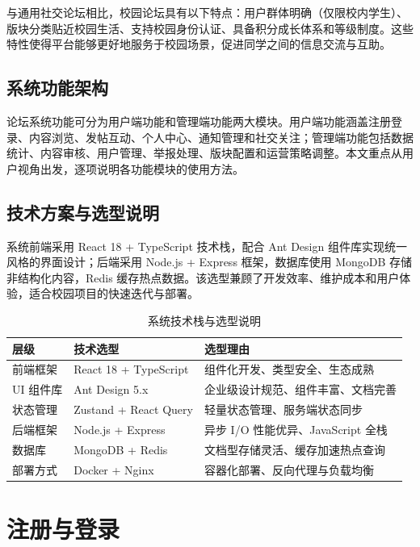 \documentclass[12pt,a4paper]{article}
\begin{document}
与通用社交论坛相比，校园论坛具有以下特点：用户群体明确（仅限校内学生）、版块分类贴近校园生活、支持校园身份认证、具备积分成长体系和等级制度。这些特性使得平台能够更好地服务于校园场景，促进同学之间的信息交流与互助。

\subsection{系统功能架构}
论坛系统功能可分为用户端功能和管理端功能两大模块。用户端功能涵盖注册登录、内容浏览、发帖互动、个人中心、通知管理和社交关注；管理端功能包括数据统计、内容审核、用户管理、举报处理、版块配置和运营策略调整。本文重点从用户视角出发，逐项说明各功能模块的使用方法。

\subsection{技术方案与选型说明}
系统前端采用 React 18 + TypeScript 技术栈，配合 Ant Design 组件库实现统一风格的界面设计；后端采用 Node.js + Express 框架，数据库使用 MongoDB 存储非结构化内容，Redis 缓存热点数据。该选型兼顾了开发效率、维护成本和用户体验，适合校园项目的快速迭代与部署。

\begin{table}[!htbp]
    \caption{系统技术栈与选型说明}
    \label{tab:tech-stack}
    \centering
    \small
    \begin{tabular}{p{}p{}p{}}
        \toprule[1.5pt]
        层级 & 技术选型 & 选型理由 \\
        \midrule[1pt]
        前端框架 & React 18 + TypeScript & 组件化开发、类型安全、生态成熟 \\
        UI 组件库 & Ant Design 5.x & 企业级设计规范、组件丰富、文档完善 \\
        状态管理 & Zustand + React Query & 轻量状态管理、服务端状态同步 \\
        后端框架 & Node.js + Express & 异步 I/O 性能优异、JavaScript 全栈 \\
        数据库 & MongoDB + Redis & 文档型存储灵活、缓存加速热点查询 \\
        部署方式 & Docker + Nginx & 容器化部署、反向代理与负载均衡 \\
        \bottomrule[1.5pt]
    \end{tabular}
\end{table}

\section{注册与登录}
\end{document}
